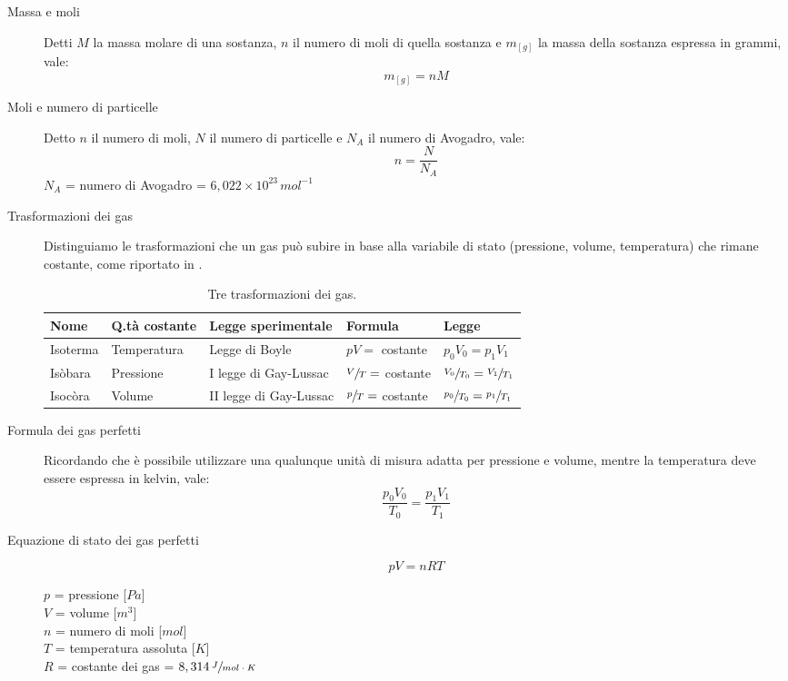 \documentclass[a4paper,11pt,italian]{article}
\begin{document}
\begin{description}
  \item[Massa e moli]
  Detti $ M $ la massa molare di una sostanza, $ n $  il numero di moli di quella sostanza e $ m_{[g]} $ la massa della sostanza espressa in grammi, vale: 
  \[ m_{[g]} = n M \]
  
  \item[Moli e numero di particelle]
  Detto $ n $ il numero di moli, $ N $ il numero di particelle e $ N_A $ il numero di Avogadro, vale: 
  \[ n = \frac{N}{N_A} \]
  $ N_A $ = numero di Avogadro = $ 6,022 \times 10^{23} \, mol^{-1} $
  
  \item[Trasformazioni dei gas]
  Distinguiamo le trasformazioni che un gas può subire in base alla variabile di stato (pressione, volume, temperatura) che rimane costante, come riportato in .
  
  \begin{table}[htb]\centering
  \begin{tabular}{lllll}\toprule
     \textbf{Nome} & \textbf{Q.tà costante} & \textbf{Legge sperimentale} & \textbf{Formula} & \textbf{Legge}\\\midrule
     Isoterma & Temperatura & Legge di Boyle & $ pV= $ costante & $ p_0V_0 = p_1V_1  $\\\addlinespace[.2em]
     Isòbara & Pressione & I legge di Gay-Lussac & $ \sfrac{V}{T} = $ costante & $ \sfrac{V_0}{T_0} = \sfrac{V_1}{T_1} $\\\addlinespace[.2em]
     Isocòra & Volume & II legge di Gay-Lussac & $ \sfrac{p}{T} = $ costante & $ \sfrac{p_0}{T_0} = \sfrac{p_1}{T_1} $\\\bottomrule
   \end{tabular}
   \caption{Tre trasformazioni dei gas.}
  \label{tab:trasformazioni}
   \end{table}
  
  \item[Formula dei gas perfetti]
  Ricordando che è possibile utilizzare una qualunque unità di misura adatta per pressione e volume, mentre la temperatura deve essere espressa in kelvin, vale: 
  \[ \dfrac{p_0 V_0}{T_0} = \dfrac{p_1 V_1}{T_1} \]
  
  \item[Equazione di stato dei gas perfetti]
  \[ pV = nRT \]
  \begin{multicols}{2}
  $ p $ = pressione [$ Pa $]\\
  $ V $ = volume [$ m^3 $]\\
  $ n $ = numero di moli [$ mol $]\\
  $ T $ = temperatura assoluta [$ K $]\\
  $ R $ = costante dei gas = $ 8,314 \, \sfrac{J}{mol \cdot K} $
  \end{multicols}
\end{description}
\end{document}
